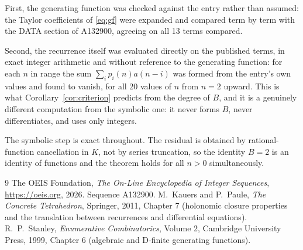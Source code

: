 \documentclass[11pt,a4paper]{article}
\theoremstyle{plain}
\theoremstyle{definition}
\begin{document}
First, the generating function was checked against the entry rather than assumed: the
Taylor coefficients of \eqref{eq:gf} were expanded and compared term by term with the DATA
section of A132900, agreeing on all 13 terms compared.

Second, the recurrence itself was evaluated directly on the published terms, in exact
integer arithmetic and without reference to the generating function: for each $n$ in range
the sum $\sum_{i}p_{i}(n)a(n-i)$ was formed from the entry's own values and found to
vanish, for all 20 values of $n$ from $n=2$ upward. This is what
Corollary~\ref{cor:criterion} predicts from the degree of $B$, and it is a genuinely
different computation from the symbolic one: it never forms $B$, never differentiates, and
uses only integers.

The symbolic step is exact throughout. The residual is obtained by rational-function
cancellation in $K$, not by series truncation, so the identity $B=2$ is an
identity of functions and the theorem holds for all $n>0$ simultaneously.

\begin{thebibliography}{9}
 The OEIS Foundation, \emph{The On-Line Encyclopedia of Integer Sequences},
\url{https://oeis.org}, 2026. Sequence A132900.
 M.~Kauers and P.~Paule, \emph{The Concrete Tetrahedron}, Springer, 2011,
Chapter 7 (holonomic closure properties and the translation between recurrences and
differential equations).
 R.~P.~Stanley, \emph{Enumerative Combinatorics}, Volume 2, Cambridge
University Press, 1999, Chapter 6 (algebraic and D-finite generating functions).
\end{thebibliography}
\end{document}

